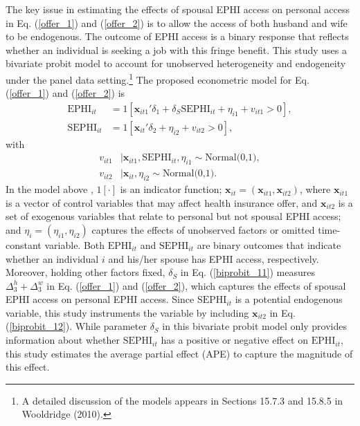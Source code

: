 \documentclass[legno,11pt]{article}
\begin{document}
The key issue in estimating the effects of spousal EPHI access on
personal access in Eq. (\ref{offer_1}) and (\ref{offer_2}) is to
allow the access of both husband and wife to be endogenous. The
outcome of EPHI access is a binary response that reflects whether an
individual is seeking a job with this fringe benefit. This study
uses a bivariate probit model to account for unobserved
heterogeneity and endogeneity under the panel data
setting.\footnote{A detailed discussion of the models appears in
Sections 15.7.3 and 15.8.5 in Wooldridge (2010).} The proposed
econometric model for Eq. (\ref{offer_1}) and (\ref{offer_2}) is
\begin{align}
\text{EPHI}_{it}&= 1[\textbf{x}_{it1}'\delta_{1}+\delta_{S}\text{SEPHI}_{it}+\eta_{i1}+ v_{it1}>0],\label{biprobit_11}\\ %
\text{SEPHI}_{it}&= 1[\textbf{x}_{it}'\delta_{2}+\eta_{i2}+ v_{it2}>0],\label{biprobit_12} %
\end{align}
with
\begin{align}
v_{it1}&\Big|\textbf{x}_{it1},\text{SEPHI}_{it},\eta_{i1}\sim\text{Normal(0,1)},\\
v_{it2}&\Big|\textbf{x}_{it},\eta_{i2}\sim\text{Normal(0,1)}.
\end{align}
In the model above , $1[\cdot]$ is an indicator function;
$\textbf{x}_{it}=(\textbf{x}_{it1},\textbf{x}_{it2})$, where
$\textbf{x}_{it1}$ is a vector of control variables that may affect
health insurance offer, and $\textbf{x}_{it2}$ is a set of exogenous
variables that relate to personal but not spousal EPHI access; and
$\eta_{i}=(\eta_{i1},\eta_{i2})$ captures the effects of unobserved
factors or omitted time-constant variable. Both $\text{EPHI}_{it}$
and $\text{SEPHI}_{it}$ are binary outcomes that indicate whether an
individual $i$ and his/her spouse has EPHI access, respectively.
Moreover, holding other factors fixed, $\delta_{S}$ in Eq.
(\ref{biprobit_11}) measures $\Delta_{3}^{h}+\Delta_{3}^{w}$ in Eq.
(\ref{offer_1}) and (\ref{offer_2}), which captures the effects of
spousal EPHI access on personal EPHI access. Since
$\text{SEPHI}_{it}$ is a potential endogenous variable, this study
instruments the variable by including $\textbf{x}_{it2}$ in Eq.
(\ref{biprobit_12}). While parameter $\delta_{S}$ in this bivariate
probit model only provides information about whether
$\text{SEPHI}_{it}$ has a positive or negative effect on
$\text{EPHI}_{it}$, this study estimates the average partial effect
(APE) to capture the magnitude of this effect.
\par
\end{document}

